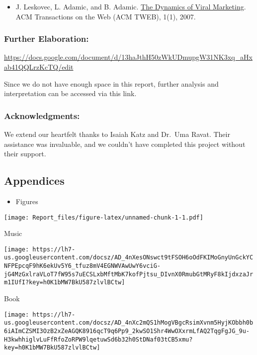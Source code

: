 \documentclass[
]{article}
\providecommand{\tightlist}{%
  \setlength{\itemsep}{0pt}\setlength{\parskip}{0pt}}
\begin{document}
\begin{itemize}
\tightlist
\item
  J. Leskovec, L. Adamic, and B. Adamic.
  \href{https://doi.org/10.1145/1232722.1232727}{The Dynamics of Viral
  Marketing}. ACM Transactions on the Web (ACM TWEB), 1(1), 2007.
\end{itemize}

\subsubsection{Further Elaboration:}\label{further-elaboration}

\url{https://docs.google.com/document/d/13haJthH50zWkUDmupgW31NK3xq_aHxab41QQLrzKcTQ/edit}

Since we do not have enough space in this report, further analysis and
interpretation can be accessed via this link.

\subsubsection{Acknowledgments:}\label{acknowledgments}

We extend our heartfelt thanks to Isaiah Katz and Dr.~Uma Ravat. Their
assistance was invaluable, and we couldn't have completed this project
without their support.

\subsection{Appendices}\label{appendices}

\begin{itemize}
\tightlist
\item
  Figures
\end{itemize}

\texttt{[image: Report\_files/figure-latex/unnamed-chunk-1-1.pdf]}

Music

\texttt{[image: https://lh7-us.googleusercontent.com/docsz/AD\_4nXesONswct9tFSOH6oOdFKIMoGnyUnGckYCNFPEpcqF9hK6ekUv5Y6\_tfuz8mV4EGNWVAwUwY6vciG-jG4MzGxlraVLoT7fW95s7uECSLxbMftMbK7kofPjtsu\_DIvnX0RmubGtMRyF8kIjdxzaJrm1IUfI?key=h0K1bMW7BkU587zlvlBCtw]}

Book

\texttt{[image: https://lh7-us.googleusercontent.com/docsz/AD\_4nXc2mQS1hMogVBgcRsimXvnm5HyjKObbh0b6iAImCZSMI3OzB2xZeAGQK8916qcT9q6Pp9\_2kwSO1Shr4WwOXxrmLfAQ2TqgFgJG\_9u-H3kwhhiglvLuFfRfoZoRPW9lqetuwSd6b32h0StDNaf03tCB5xmu?key=h0K1bMW7BkU587zlvlBCtw]}
\end{document}
